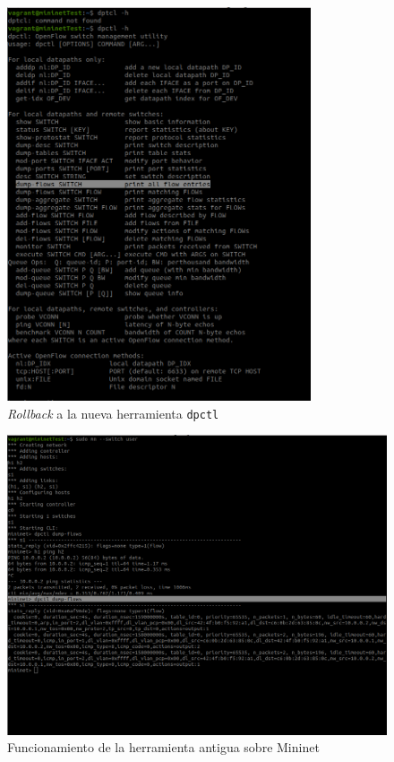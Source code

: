 \begin{figure}[ht!]
    \centering
    \includegraphics[width=0.8\textwidth]{archivos/img/dev/dpctl_5.png}
    \caption{\textit{Rollback} a la nueva herramienta \texttt{dpctl}}
    \label{fig:dpctl_5}
\end{figure}

\newpage

\begin{figure}[ht!]
    \centering
    \includegraphics[width=\textwidth]{archivos/img/dev/dpctl_6.png}
    \caption{Funcionamiento de la herramienta antigua sobre Mininet}
    \label{fig:dpctl_6}
\end{figure}